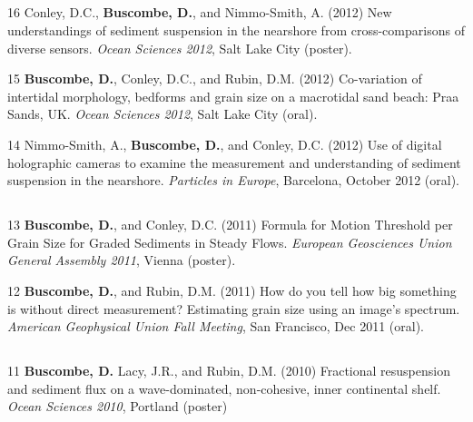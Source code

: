 \documentclass[margin,line]{resume}
\begin{document}
\begin{resume}
\begin{footnotesize}
	\subsection{}
	\begin{list1}
        \item[16] Conley, D.C., {\bf Buscombe, D.}, and Nimmo-Smith, A. (2012) New understandings of sediment suspension in the nearshore from cross-comparisons of diverse  sensors. {\sl Ocean Sciences 2012}, Salt Lake City (poster).\\

	\item[15] {\bf Buscombe, D.}, Conley, D.C., and Rubin, D.M. (2012) Co-variation of intertidal morphology, bedforms and grain size on a macrotidal sand beach: Praa Sands, UK. {\sl Ocean Sciences 2012}, Salt Lake City (oral).\\

	\item[14] Nimmo-Smith, A., {\bf Buscombe, D.}, and Conley, D.C. (2012) Use of digital holographic cameras to examine the measurement and understanding of sediment suspension in the nearshore. {\sl Particles in Europe}, Barcelona, October 2012 (oral).

	\end{list1}

	\subsection{}
	\begin{list1}
	\item[13] {\bf Buscombe, D.}, and Conley, D.C. (2011) Formula for Motion Threshold per Grain Size for Graded Sediments in Steady Flows. {\sl European Geosciences Union General Assembly 2011}, Vienna (poster).\\

        \item[12] {\bf Buscombe, D.}, and Rubin, D.M. (2011) How do you tell how big something is without direct measurement? Estimating grain size using an image’s spectrum. {\sl American Geophysical Union Fall Meeting}, San Francisco, Dec 2011 (oral).
	\end{list1}

	\subsection{}
	\begin{list1}
	\item[11] {\bf Buscombe, D.} Lacy, J.R., and Rubin, D.M. (2010) Fractional resuspension and sediment flux on a wave-dominated, non-cohesive, inner continental shelf. {\sl Ocean Sciences 2010}, Portland (poster)\\


\end{list1}
\end{footnotesize}
\end{resume}
\end{document}
